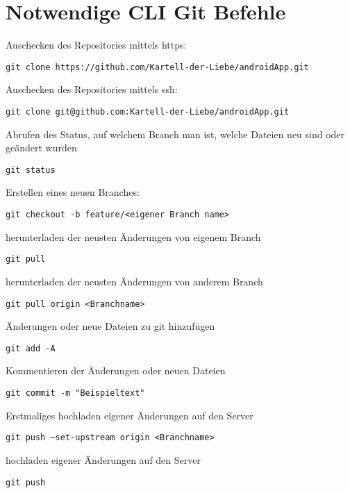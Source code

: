 \documentclass[a4paper,12pt,
headsepline,           %
oneside,               %
pointlessnumbers,      %
bibtotoc,              %
BCOR15mm               %
]{scrbook}
\begin{document}
  \section*{Notwendige CLI Git Befehle}
  Auschecken des Repositories mittels https:

  \texttt{git clone https://github.com/Kartell-der-Liebe/androidApp.git}

  Auschecken des Repositories mittels ssh:

  \texttt{git clone git@github.com:Kartell-der-Liebe/androidApp.git}

  Abrufen des Status, auf welchem Branch man ist, welche Dateien neu sind oder geändert wurden

  \texttt{git status}

  Erstellen eines neuen Branches:

  \texttt{git checkout -b feature/<eigener Branch name>}

  herunterladen der neusten Änderungen von eigenem Branch

  \texttt{git pull}

  herunterladen der neusten Änderungen von anderem Branch

  \texttt{git pull origin <Branchname>}

  Änderungen oder neue Dateien zu git hinzufügen

  \texttt{git add -A}

  Kommentieren der Änderungen oder neuen Dateien

  \texttt{git commit -m "Beispieltext"}

  Erstmaliges hochladen eigener Änderungen auf den Server

  \texttt{git push ---set-upstream origin <Branchname>}

  hochladen eigener Änderungen auf den Server

  \texttt{git push}
  
\end{document}
